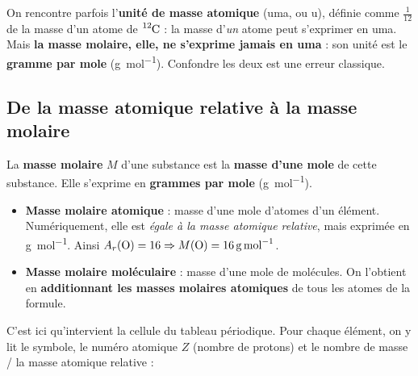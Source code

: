 \documentclass[11pt,a4paper]{article}
\begin{document}
\begin{attention}
On rencontre parfois l'\textbf{unité de masse atomique} (uma, ou u), définie comme $\frac{1}{12}$ de
la masse d'un atome de $\ce{^{12}C}$ : la masse d'\emph{un} atome peut s'exprimer en uma. Mais
\textbf{la masse molaire, elle, ne s'exprime jamais en uma} : son unité est le
\textbf{gramme par mole} (\si{\gram\per\mole}). Confondre les deux est une erreur classique.
\end{attention}

\subsection{De la masse atomique relative à la masse molaire}

\begin{definition}
La \textbf{masse molaire} $M$ d'une substance est la \textbf{masse d'une mole} de cette substance.
Elle s'exprime en \textbf{grammes par mole} (\si{\gram\per\mole}).
\begin{itemize}[leftmargin=1.6em,topsep=2pt,itemsep=1pt]
  \item \textbf{Masse molaire atomique} : masse d'une mole d'atomes d'un élément. Numériquement, elle
        est \emph{égale à la masse atomique relative}, mais exprimée en \si{\gram\per\mole}. Ainsi
        $A_r(\ce{O}) = 16 \Rightarrow M(\ce{O}) = \SI{16}{\gram\per\mole}$.
  \item \textbf{Masse molaire moléculaire} : masse d'une mole de molécules. On l'obtient en
        \textbf{additionnant les masses molaires atomiques} de tous les atomes de la formule.
\end{itemize}
\end{definition}

\noindent
C'est ici qu'intervient la cellule du tableau périodique. Pour chaque élément, on y lit le symbole,
le numéro atomique $Z$ (nombre de protons) et le nombre de masse / la masse atomique relative :

\begin{center}
\end{center}
\end{document}
